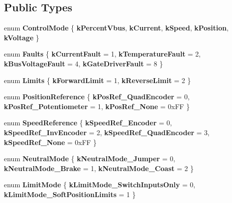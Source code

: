 \subsection*{\-Public \-Types}
\begin{DoxyCompactItemize}
\item 
enum {\bfseries \-Control\-Mode} \{ \*
{\bfseries k\-Percent\-Vbus}, 
{\bfseries k\-Current}, 
{\bfseries k\-Speed}, 
{\bfseries k\-Position}, 
\*
{\bfseries k\-Voltage}
 \}
\item 
enum {\bfseries \-Faults} \{ {\bfseries k\-Current\-Fault} =  1, 
{\bfseries k\-Temperature\-Fault} =  2, 
{\bfseries k\-Bus\-Voltage\-Fault} =  4, 
{\bfseries k\-Gate\-Driver\-Fault} =  8
 \}
\item 
enum {\bfseries \-Limits} \{ {\bfseries k\-Forward\-Limit} =  1, 
{\bfseries k\-Reverse\-Limit} =  2
 \}
\item 
enum {\bfseries \-Position\-Reference} \{ {\bfseries k\-Pos\-Ref\-\_\-\-Quad\-Encoder} =  0, 
{\bfseries k\-Pos\-Ref\-\_\-\-Potentiometer} =  1, 
{\bfseries k\-Pos\-Ref\-\_\-\-None} =  0x\-F\-F
 \}
\item 
enum {\bfseries \-Speed\-Reference} \{ {\bfseries k\-Speed\-Ref\-\_\-\-Encoder} =  0, 
{\bfseries k\-Speed\-Ref\-\_\-\-Inv\-Encoder} =  2, 
{\bfseries k\-Speed\-Ref\-\_\-\-Quad\-Encoder} =  3, 
{\bfseries k\-Speed\-Ref\-\_\-\-None} =  0x\-F\-F
 \}
\item 
enum {\bfseries \-Neutral\-Mode} \{ {\bfseries k\-Neutral\-Mode\-\_\-\-Jumper} =  0, 
{\bfseries k\-Neutral\-Mode\-\_\-\-Brake} =  1, 
{\bfseries k\-Neutral\-Mode\-\_\-\-Coast} =  2
 \}
\item 
enum {\bfseries \-Limit\-Mode} \{ {\bfseries k\-Limit\-Mode\-\_\-\-Switch\-Inputs\-Only} =  0, 
{\bfseries k\-Limit\-Mode\-\_\-\-Soft\-Position\-Limits} =  1
 \}
\end{DoxyCompactItemize}
